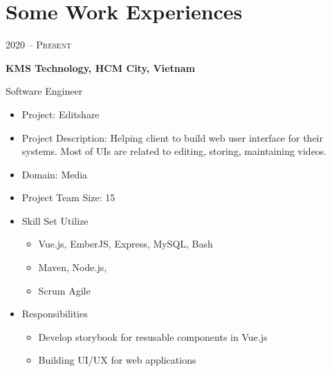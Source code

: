 \documentclass[10pt, letterpapaer]{article}
\newcommand{\bigentry}[3]{
\begin{minipage}[t]{.20\linewidth}
\hfill \textsc{#1}
\end{minipage}
\hfill\vline\hfill
\begin{minipage}[t]{.75\linewidth}
{\bf#2}\\{#3}
\end{minipage}\\
\vspace{.2cm}
}
\begin{document}
\section{Some Work Experiences}	
\bigentry{2020 – Present}
{KMS Technology, HCM City, Vietnam}
{Software Engineer
\begin{itemize}
  \item Project: Editshare
  \item Project Description: Helping client to build web user interface for their systems. Most of UIs are related to editing, storing, maintaining videos.
  \item Domain: Media
  \item Project Team Size: 15
  \item Skill Set Utilize
	\begin{itemize}
	  \item Vue.js, EmberJS, Express, MySQL, Bash
	  \item Maven, Node.js, 
	  \item Scrum Agile
	\end{itemize}
  \item Responsibilities
	\begin{itemize}
	  \item Develop storybook for resusable components in Vue.js
	  \item Building UI/UX for web applications
	\end{itemize}
\end{itemize}}
\end{document}

